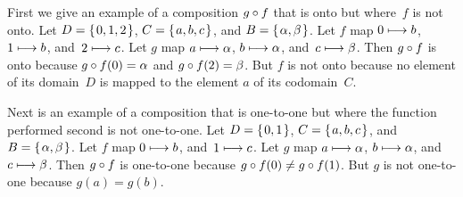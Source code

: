 \documentclass{ibl}  %
\begin{document}
\begin{problem}
\begin{exes}
\begin{answer}
  First we give an example of a composition $g\mathbin{\circ} f$ that is onto
  but where~$f$ is not onto.   
  Let $D=\mbox{$\{\hspace{0.1em}0,1,2\hspace{0.1em}\}$}$, $C=\mbox{$\{\hspace{0.1em}a,b,c\hspace{0.1em}\}$}$, and $B=\mbox{$\{\hspace{0.1em}\alpha, \beta\hspace{0.1em}\}$}$.
  Let $f$ map $0\stackrel{}{\longmapsto} b$, $1\stackrel{}{\longmapsto}b$, and~$2\stackrel{}{\longmapsto} c$.
  Let $g$ map $a\stackrel{}{\longmapsto} \alpha$, $b\stackrel{}{\longmapsto}\alpha$, 
  and~$c\stackrel{}{\longmapsto} \beta$. 
  Then $g\mathbin{\circ} f$ is onto because $g\mathbin{\circ} f(0)=\alpha$ and
  $g\mathbin{\circ} f(2)=\beta$.
  But $f$ is not onto because no element of its domain~$D$ is mapped to the
  element $a$ of its codomain~$C$. 

  Next is an example of a composition that is one-to-one but where
  the function performed second is not one-to-one.
  Let $D=\mbox{$\{\hspace{0.1em}0,1\hspace{0.1em}\}$}$, $C=\mbox{$\{\hspace{0.1em}a,b,c\hspace{0.1em}\}$}$, and $B=\mbox{$\{\hspace{0.1em}\alpha, \beta\hspace{0.1em}\}$}$.
  Let $f$ map $0\stackrel{}{\longmapsto} b$, and~$1\stackrel{}{\longmapsto}c$.
  Let $g$ map $a\stackrel{}{\longmapsto} \alpha$, $b\stackrel{}{\longmapsto}\alpha$, 
  and~$c\stackrel{}{\longmapsto} \beta$. 
  Then $g\mathbin{\circ} f$ is one-to-one because 
  $g\mathbin{\circ} f(0)\neq g\mathbin{\circ} f(1)$.
  But $g$ is not one-to-one because $g(a)=g(b)$. 
\end{answer}
\end{exes}
  

\end{problem}
\end{document}
